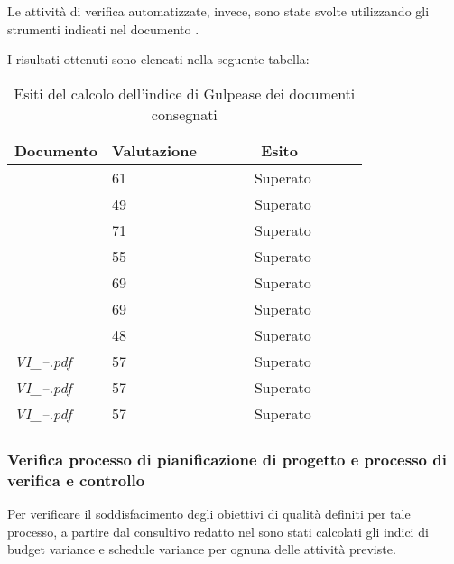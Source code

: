 		Le attività di verifica automatizzate, invece, sono state svolte utilizzando gli strumenti indicati nel documento \NdP. 
		
		I risultati ottenuti sono elencati nella seguente tabella:
		\begin{table}[H]
		\begin{tabular}{|l|l|l|}
		\hline
		\textbf{Documento} 		&\textbf{Valutazione} &\textbf{~~~~~~Esito~~~~~~} \\
		\hline
		\PdQ 					&61		&~~~~~~Superato~~~~~~\\
		\NdP 					&49		&~~~~~~Superato~~~~~~\\
		\AdR 					&71		&~~~~~~Superato~~~~~~\\
		\PdP 					&55		&~~~~~~Superato~~~~~~\\
		\ST 					&69		&~~~~~~Superato~~~~~~\\
		\DP 					&69		&~~~~~~Superato~~~~~~\\	
		\Glossario 				&48		&~~~~~~Superato~~~~~~\\
		\textit{VI_--.pdf} 		&57		&~~~~~~Superato~~~~~~\\
		\textit{VI_--.pdf} 		&57		&~~~~~~Superato~~~~~~\\
		\textit{VI_--.pdf} 		&57		&~~~~~~Superato~~~~~~\\
		\hline
		\end{tabular}
		\caption{Esiti del calcolo dell'indice di Gulpease dei documenti consegnati}
		\end{table}
		
		\subsubsection{Verifica processo di pianificazione di progetto e processo di verifica e controllo}
		Per verificare il soddisfacimento degli obiettivi di qualità definiti per tale processo, a partire dal consultivo redatto nel \PdP{} sono stati calcolati gli indici di budget variance e schedule variance per ognuna delle attività previste.
		
